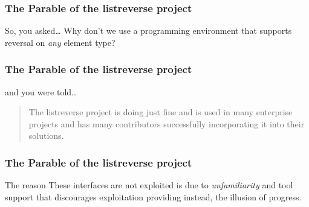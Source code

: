 \begin{frame}
\frametitle{The Parable of the listreverse project}
\begin{block}{So, you asked\ldots}
Why don't we use a programming environment that supports reversal on \emph{any} element type?
\end{block}
\end{frame}

\begin{frame}
\frametitle{The Parable of the listreverse project}
\begin{block}{and you were told\ldots}
\begin{quote}
The listreverse project is doing just fine and is used in many enterprise projects and has many contributors successfully incorporating it into their solutions.
\end{quote}
\end{block}
\end{frame}

\begin{frame}
\frametitle{The Parable of the listreverse project}
\begin{block}{The reason}
These interfaces are not exploited is due to \emph{unfamiliarity} and tool support that discourages exploitation providing instead, the illusion of progress.
\end{block}
\end{frame}






